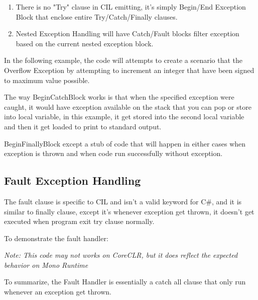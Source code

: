 \begin{enumerate}
\item There is no "Try" clause in CIL emitting, it's simply Begin/End Exception Block that enclose entire Try/Catch/Finally clauses.
\item Nested Exception Handling will have Catch/Fault blocks filter exception based on the current nested exception block.
\end{enumerate}

In the following example, the code will attempts to create a scenario that the Overflow Exception by attempting to increment an integer that have been signed to maximum value possible.



The way BeginCatchBlock works is that when the specified exception were caught, it would have exception available on the stack that you can pop or store into local variable, in this example, it get stored into the second local variable and then it get loaded to print to standard output.

BeginFinallyBlock except a stub of code that will happen in either cases when exception is thrown and when code run successfully without exception.

\subsection{Fault Exception Handling}
The fault clause is specific to CIL and isn't a valid keyword for C\#, and it is similar to finally clause, except it's whenever exception get thrown, it doesn't get executed when program exit try clause normally.

To demonstrate the fault handler:



\textit{Note: This code may not works on CoreCLR, but it does reflect the expected behavior on Mono Runtime}

To summarize, the Fault Handler is essentially a catch all clause that only run whenever an exception get thrown.

